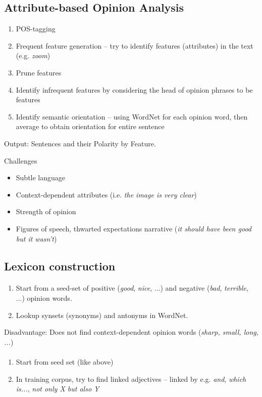 \documentclass[10pt,twocolumn]{article}
\begin{document}
\subsection{Attribute-based Opinion Analysis}

\begin{enumerate}
\item POS-tagging
\item Frequent feature generation -- try to identify features (attributes) in
  the text (e.g. \textit{zoom})
\item Prune features
\item Identify infrequent features by considering the head of opinion phrases to
  be features
\item Identify semantic orientation -- using WordNet for each opinion word, then
  average to obtain orientation for entire sentence
\end{enumerate}
Output: Sentences and their Polarity by Feature.

Challenges
\begin{itemize}
\item Subtle language
\item Context-dependent attributes (i.e. \textit{the image is very clear})
\item Strength of opinion
\item Figures of speech, thwarted expectations narrative (\textit{it should have
  been good but it wasn't})
\end{itemize}


\subsection{Lexicon construction}

\paragraph{ }
\begin{enumerate}
\item Start from a seed-set of positive (\textit{good}, \textit{nice}, ...) and
  negative (\textit{bad}, \textit{terrible}, ...) opinion words.
\item Lookup synsets (synonyms) and antonyms in WordNet.
\end{enumerate}
Disadvantage: Does not find context-dependent opinion words (\textit{sharp,
  small, long, ...})

\paragraph{ }
\begin{enumerate}
\item Start from seed set (like above)
\item In training corpus, try to find linked adjectives -- linked by e.g.
  \textit{and}, \textit{which is...}, \textit{not only X but also Y}
\end{enumerate}
\end{document}
